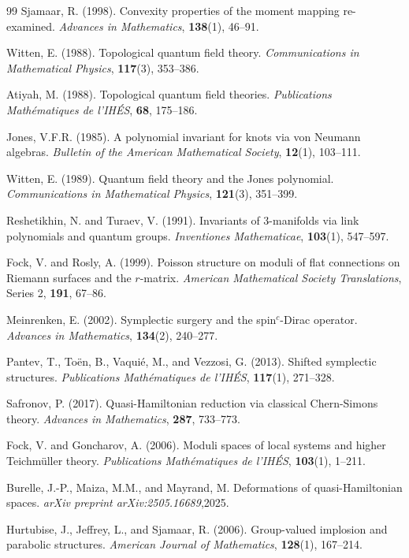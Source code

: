 \documentclass[reqno]{amsart}
\theoremstyle{plain}
\theoremstyle{definition}
\begin{document}
\begin{thebibliography}{99}
Sjamaar, R. (1998).
Convexity properties of the moment mapping re-examined.
\textit{Advances in Mathematics}, \textbf{138}(1), 46--91.

Witten, E. (1988). 
Topological quantum field theory. 
\textit{Communications in Mathematical Physics}, \textbf{117}(3), 353--386.

Atiyah, M. (1988). 
Topological quantum field theories. 
\textit{Publications Mathématiques de l'IHÉS}, \textbf{68}, 175--186.

Jones, V.F.R. (1985). 
A polynomial invariant for knots via von Neumann algebras. 
\textit{Bulletin of the American Mathematical Society}, \textbf{12}(1), 103--111.

Witten, E. (1989). 
Quantum field theory and the Jones polynomial. 
\textit{Communications in Mathematical Physics}, \textbf{121}(3), 351--399.

Reshetikhin, N. and Turaev, V. (1991). 
Invariants of 3-manifolds via link polynomials and quantum groups. 
\textit{Inventiones Mathematicae}, \textbf{103}(1), 547--597.

Fock, V. and Rosly, A. (1999).
Poisson structure on moduli of flat connections on Riemann surfaces and the $r$-matrix.
\textit{American Mathematical Society Translations}, Series 2, \textbf{191}, 67--86.

Meinrenken, E. (2002). 
Symplectic surgery and the spin$^c$-Dirac operator. 
\textit{Advances in Mathematics}, \textbf{134}(2), 240--277.

Pantev, T., Toën, B., Vaquié, M., and Vezzosi, G. (2013). 
Shifted symplectic structures. 
\textit{Publications Mathématiques de l'IHÉS}, \textbf{117}(1), 271--328.

Safronov, P. (2017). 
Quasi-Hamiltonian reduction via classical Chern-Simons theory. 
\textit{Advances in Mathematics}, \textbf{287}, 733--773.

Fock, V. and Goncharov, A. (2006). 
Moduli spaces of local systems and higher Teichmüller theory. 
\textit{Publications Mathématiques de l'IHÉS}, \textbf{103}(1), 1--211.

Burelle, J.-P., Maiza, M.M., and Mayrand, M.
Deformations of quasi-Hamiltonian spaces. 
\textit{arXiv preprint arXiv:2505.16689},2025.

Hurtubise, J., Jeffrey, L., and Sjamaar, R. (2006).
Group-valued implosion and parabolic structures.
\textit{American Journal of Mathematics}, \textbf{128}(1), 167--214.


\end{thebibliography}
\end{document}
